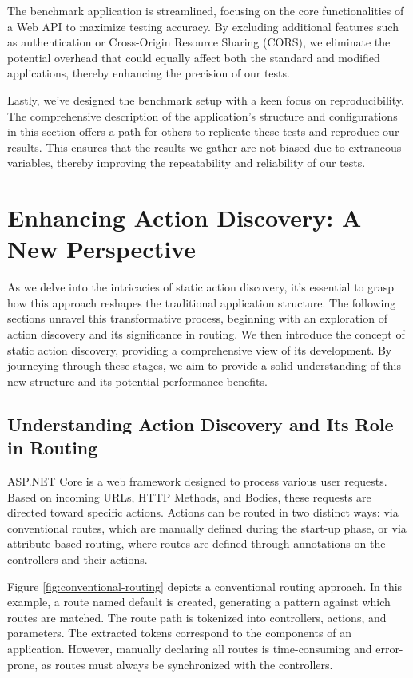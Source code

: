 The benchmark application is streamlined, focusing on the core functionalities of a Web API to maximize testing accuracy. By excluding additional features such as authentication or Cross-Origin Resource Sharing (CORS), we eliminate the potential overhead that could equally affect both the standard and modified applications, thereby enhancing the precision of our tests.

Lastly, we've designed the benchmark setup with a keen focus on reproducibility. The comprehensive description of the application's structure and configurations in this section offers a path for others to replicate these tests and reproduce our results. This ensures that the results we gather are not biased due to extraneous variables, thereby improving the repeatability and reliability of our tests.

\section{Enhancing Action Discovery: A New Perspective}

As we delve into the intricacies of static action discovery, it's essential to grasp how this approach reshapes the traditional application structure. The following sections unravel this transformative process, beginning with an exploration of action discovery and its significance in routing. We then introduce the concept of static action discovery, providing a comprehensive view of its development. By journeying through these stages, we aim to provide a solid understanding of this new structure and its potential performance benefits.

\subsection{Understanding Action Discovery and Its Role in Routing}

ASP.NET Core is a web framework designed to process various user requests. Based on incoming URLs, HTTP Methods, and Bodies, these requests are directed toward specific actions. Actions can be routed in two distinct ways: via conventional routes, which are manually defined during the start-up phase, or via attribute-based routing, where routes are defined through annotations on the controllers and their actions.

Figure \ref{fig:conventional-routing} depicts a conventional routing approach. In this example, a route named default is created, generating a pattern against which routes are matched. The route path is tokenized into controllers, actions, and parameters. The extracted tokens correspond to the components of an application. However, manually declaring all routes is time-consuming and error-prone, as routes must always be synchronized with the controllers.

